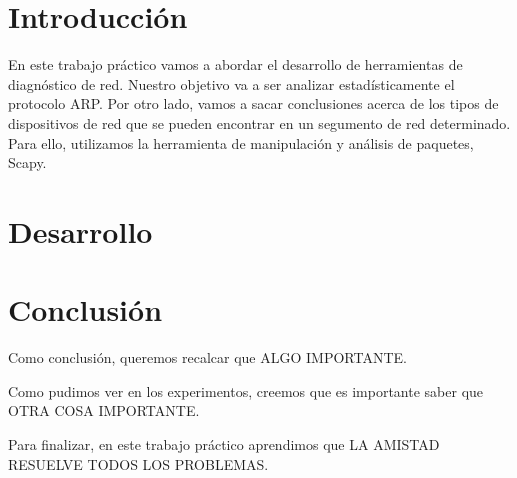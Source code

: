 \documentclass[10pt, a4paper]{article}
\begin{document}

\thispagestyle{empty}

\maketitle

\thispagestyle{empty}
\tableofcontents

\newpage

\section{Introducción}
En este trabajo práctico vamos a abordar el desarrollo de herramientas de diagnóstico de red. Nuestro objetivo va a ser analizar estadísticamente el protocolo ARP. Por otro lado, vamos a sacar conclusiones acerca de los tipos de dispositivos de red que se pueden encontrar en un segumento de red determinado. Para ello, utilizamos la herramienta de manipulación y análisis de paquetes, Scapy.

\section{Desarrollo}


\section{Conclusión}
Como conclusión, queremos recalcar que ALGO IMPORTANTE.

Como pudimos ver en los experimentos, creemos que es importante saber que OTRA COSA IMPORTANTE.

Para finalizar, en este trabajo práctico aprendimos que LA AMISTAD RESUELVE TODOS LOS PROBLEMAS.
\end{document}
